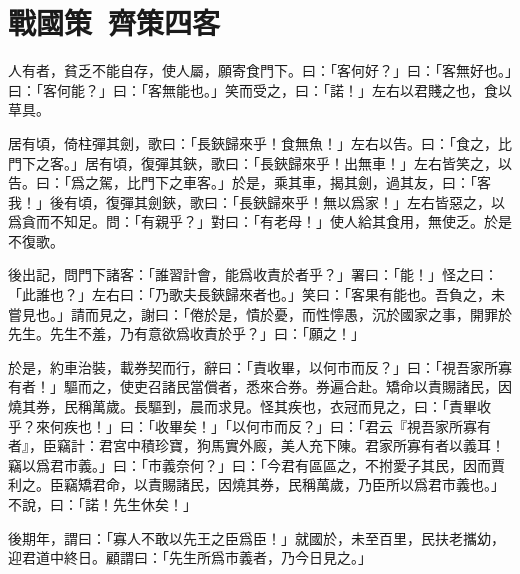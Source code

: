 \theendnotes

\section[馮煖客孟嘗君\quad {\small 戰國策\ 齊策四}]{{\normalsize 戰國策\ 齊策四}\quad {}客}
人有者，貧乏不能自存，使人屬，願寄食門下。曰：「客何好？」曰：「客無好也。」曰：「客何能？」曰：「客無能也。」笑而受之，曰：「諾！」左右以君賤之也，食以草具。

居有頃，倚柱彈其劍，歌曰：「長鋏歸來乎！食無魚！」左右以告。曰：「食之，比門下之客。」居有頃，復彈其鋏，歌曰：「長鋏歸來乎！出無車！」左右皆笑之，以告。曰：「爲之駕，比門下之車客。」於是，乘其車，揭其劍，過其友，曰：「客我！」後有頃，復彈其劍鋏，歌曰：「長鋏歸來乎！無以爲家！」左右皆惡之，以爲貪而不知足。問：「有親乎？」對曰：「有老母！」使人給其食用，無使乏。於是不復歌。

後出記，問門下諸客：「誰習計會，能爲收責於者乎？」署曰：「能！」怪之曰：「此誰也？」左右曰：「乃歌夫長鋏歸來者也。」笑曰：「客果有能也。吾負之，未嘗見也。」請而見之，謝曰：「倦於是，憒於憂，而性懧愚，沉於國家之事，開罪於先生。先生不羞，乃有意欲爲收責於乎？」曰：「願之！」

於是，約車治裝，載券契而行，辭曰：「責收畢，以何市而反？」曰：「視吾家所寡有者！」驅而之，使吏召諸民當償者，悉來合券。券遍合赴。矯命以責賜諸民，因燒其券，民稱萬歲。長驅到，晨而求見。怪其疾也，衣冠而見之，曰：「責畢收乎？來何疾也！」曰：「收畢矣！」「以何市而反？」曰：「君云『視吾家所寡有者』，臣竊計：君宮中積珍寶，狗馬實外廄，美人充下陳。君家所寡有者以義耳！竊以爲君市義。」曰：「市義奈何？」曰：「今君有區區之，不拊愛子其民，因而賈利之。臣竊矯君命，以責賜諸民，因燒其券，民稱萬歲，乃臣所以爲君市義也。」不說，曰：「諾！先生休矣！」

後期年，謂曰：「寡人不敢以先王之臣爲臣！」就國於，未至百里，民扶老攜幼，迎君道中終日。顧謂曰：「先生所爲市義者，乃今日見之。」

